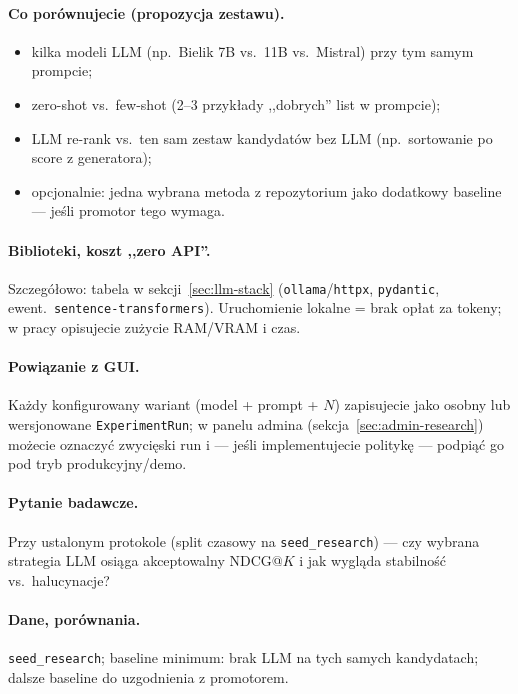 \documentclass[a4paper,11pt]{article}
\newcommand{\code}[1]{\texttt{\small #1}}
\begin{document}
\paragraph{Co porównujecie (propozycja zestawu).}
\begin{itemize}[leftmargin=1.5em,itemsep=1pt]
  \item kilka modeli LLM (np.\ Bielik 7B vs.\ 11B vs.\ Mistral) przy tym samym prompcie;
  \item zero-shot vs.\ few-shot (2--3 przykłady ,,dobrych'' list w prompcie);
  \item LLM re-rank vs.\ ten sam zestaw kandydatów bez LLM (np.\ sortowanie po score z generatora);
  \item opcjonalnie: jedna wybrana metoda z repozytorium jako dodatkowy baseline --- jeśli promotor tego wymaga.
\end{itemize}

\paragraph{Biblioteki, koszt ,,zero API''.}
Szczegółowo: tabela w sekcji~\ref{sec:llm-stack} (\code{ollama}/\code{httpx}, \code{pydantic}, ewent.\ \code{sentence-transformers}). Uruchomienie lokalne = brak opłat za tokeny; w pracy opisujecie zużycie RAM/VRAM i czas.

\paragraph{Powiązanie z GUI.}
Każdy konfigurowany wariant (model + prompt + $N$) zapisujecie jako osobny lub wersjonowane \code{ExperimentRun}; w panelu admina (sekcja~\ref{sec:admin-research}) możecie oznaczyć zwycięski run i --- jeśli implementujecie politykę --- podpiąć go pod tryb produkcyjny/demo.

\paragraph{Pytanie badawcze.}
Przy ustalonym protokole (split czasowy na \texttt{seed\_research}) --- czy wybrana strategia LLM osiąga akceptowalny NDCG@$K$ i jak wygląda stabilność vs.\ halucynacje?

\paragraph{Dane, porównania.}
\texttt{seed\_research}; baseline minimum: brak LLM na tych samych kandydatach; dalsze baseline do uzgodnienia z promotorem.
\end{document}
